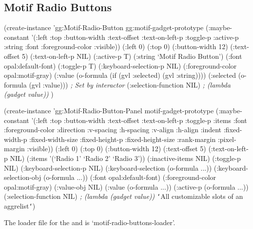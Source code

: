 \begin{group}
\subsection{Motif Radio Buttons}
\label{motif-radio-buttons}

\begin{programexample}
(create-instance 'gg:Motif-Radio-Button gg:motif-gadget-prototype
   (:maybe-constant '(:left :top :button-width :text-offset :text-on-left-p
		      :toggle-p :active-p :string :font :foreground-color :visible))
   (:left 0)
   (:top 0)
   (:button-width 12)
   (:text-offset 5)
   (:text-on-left-p NIL)
   (:active-p T)
   (:string `Motif Radio Button')
   (:font opal:default-font)
   (:toggle-p T)
   (:keyboard-selection-p NIL)
   (:foreground-color opal:motif-gray)
   (:value (o-formula (if (gvl :selected) (gvl :string))))
   (:selected (o-formula (gvl :value)))  {\it ; Set by interactor}
   (:selection-function NIL)             {\it ; (lambda (gadget value))}
   )
\end{programexample}
\end{group}
\vspace{1 line}

\begin{group}
\begin{programexample}
(create-instance 'gg:Motif-Radio-Button-Panel motif-gadget-prototype
   (:maybe-constant '(:left :top :button-width :text-offset :text-on-left-p :toggle-p
                      :items :font :foreground-color :direction :v-spacing :h-spacing
                      :v-align :h-align :indent :fixed-width-p :fixed-width-size
		      :fixed-height-p :fixed-height-size :rank-margin :pixel-margin
                      :visible))
   (:left 0)
   (:top 0)
   (:button-width 12)
   (:text-offset 5)
   (:text-on-left-p NIL)
   (:items '(`Radio 1' `Radio 2' `Radio 3'))
   (:inactive-items NIL)
   (:toggle-p NIL)
   (:keyboard-selection-p NIL)
   (:keyboard-selection (o-formula ...))
   (:keyboard-selection-obj (o-formula ...))
   (:font opal:default-font)
   (:foreground-color opal:motif-gray)
   (:value-obj NIL)
   (:value (o-formula ...))
   (:active-p (o-formula ...))
   (:selection-function NIL)   {\it ; (lambda (gadget value))}
   {\tt\char`\<}All customizable slots of an aggrelist{\tt\char`\>})
\end{programexample}
\end{group}

The loader file for the  and
 is `motif-radio-buttons-loader'.

